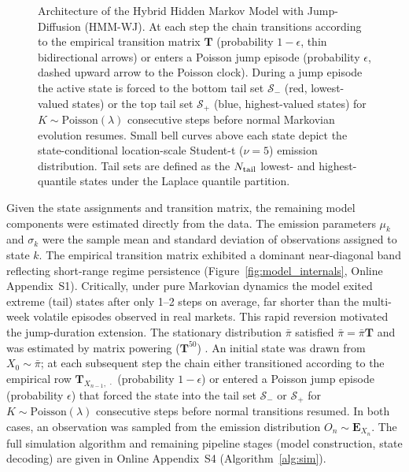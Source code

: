 \begin{figure}[tp]
{\begin{tikzpicture}
\end{tikzpicture}%
}
\caption{Architecture of the Hybrid Hidden Markov Model with Jump-Diffusion (HMM-WJ).
    At each step the chain transitions according to the empirical transition matrix $\mathbf{T}$
    (probability $1-\epsilon$, thin bidirectional arrows) or enters a Poisson jump episode
    (probability $\epsilon$, dashed upward arrow to the Poisson clock).
    During a jump episode the active state is forced to the bottom tail set $\mathcal{S}_{-}$
    (red, lowest-valued states) or the top tail set $\mathcal{S}_{+}$ (blue, highest-valued states)
    for $K\!\sim\!\mathrm{Poisson}(\lambda)$ consecutive steps before normal Markovian evolution
    resumes.  Small bell curves above each state depict the state-conditional
    location-scale Student-t ($\nu=5$) emission distribution.  Tail sets are defined as the
    $N_{\rm tail}$ lowest- and highest-quantile states under the Laplace quantile partition.}
\label{fig:model_architecture}
\end{figure}

Given the state assignments and transition matrix, the remaining model components were estimated directly from the data. The emission parameters $\mu_k$ and $\sigma_k$ were the sample mean and standard deviation of observations assigned to state $k$. The empirical transition matrix exhibited a dominant near-diagonal band reflecting short-range regime persistence (Figure~\ref{fig:model_internals}, Online Appendix~S1). Critically, under pure Markovian dynamics the model exited extreme (tail) states after only 1--2 steps on average, far shorter than the multi-week volatile episodes observed in real markets. This rapid reversion motivated the jump-duration extension. The stationary distribution $\bar{\pi}$ satisfied $\bar{\pi} = \bar{\pi}\mathbf{T}$ and was estimated by matrix powering ($\mathbf{T}^{50}$) \cite{hamilton_regime_2018, grinstead_introduction_1997}. An initial state was drawn from $X_0 \sim \bar{\pi}$; at each subsequent step the chain either transitioned according to the empirical row $\mathbf{T}_{X_{n-1},\,\cdot}$ (probability $1-\epsilon$) or entered a Poisson jump episode (probability $\epsilon$) that forced the state into the tail set $\mathcal{S}_{-}$ or $\mathcal{S}_{+}$ for $K \sim \text{Poisson}(\lambda)$ consecutive steps before normal transitions resumed. In both cases, an observation was sampled from the emission distribution $O_n \sim \mathbf{E}_{X_n}$. The full simulation algorithm and remaining pipeline stages (model construction, state decoding) are given in Online Appendix~S4 (Algorithm~\ref{alg:sim}).


